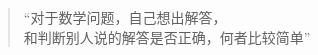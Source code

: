 
\begin{frame}
  \begin{columns}
	  \pause
  \end{columns}

  \pause
  \vspace{0.60cm}
  \begin{quote}
	\centering
	{\large ``对于数学问题，自己想出解答，\\ 和判断别人说的解答是否正确，何者比较简单''}
  \end{quote}
\end{frame}

\begin{frame}
\end{frame}
